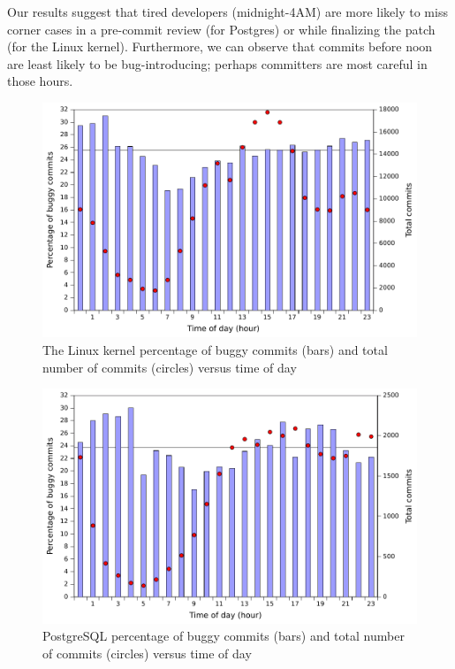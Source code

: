 Our results suggest that tired developers (midnight-4AM) are more
likely to miss corner cases in a pre-commit review (for Postgres) or
while finalizing the patch (for the Linux kernel). Furthermore, we can observe
that commits before noon are least likely to be bug-introducing;
perhaps committers are most careful in those hours.


\begin{figure}
\begin{center}
\includegraphics[width=\columnwidth]{linux-bugginess-hour.pdf}
\end{center}
\caption{The Linux kernel percentage of buggy commits (bars) and total number of commits (circles) versus time of day}
\label{fig-linux-bugginess-hour}
\end{figure}

\begin{figure}
\begin{center}
\includegraphics[width=\columnwidth]{postgresql-bugginess-hour.pdf}
\end{center}
\caption{PostgreSQL percentage of buggy commits (bars) and total number of commits (circles) versus time of day}
\label{fig-postgresql-bugginess-hour}
\end{figure}

